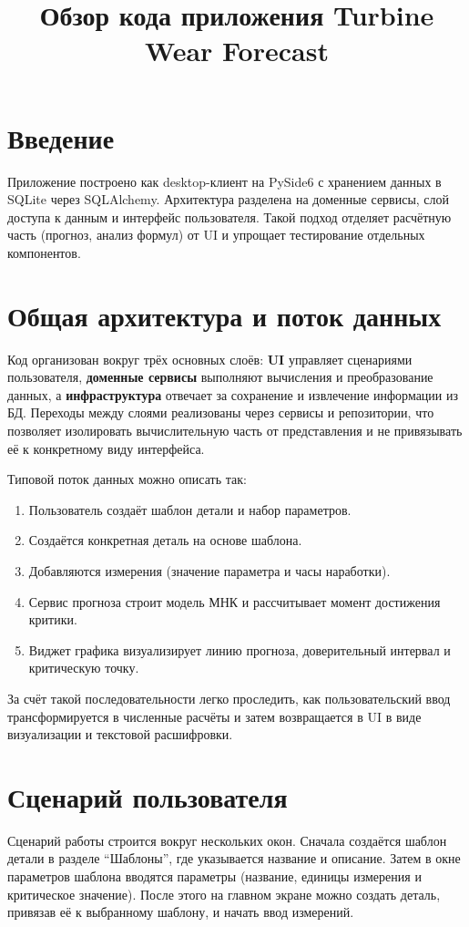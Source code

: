 \documentclass[12pt,a4paper]{article}
\title{Обзор кода приложения Turbine Wear Forecast}
\author{}
\date{}
\begin{document}
\maketitle

\section*{Введение}
Приложение построено как desktop-клиент на PySide6 с хранением данных в SQLite
через SQLAlchemy. Архитектура разделена на доменные сервисы, слой доступа к данным
и интерфейс пользователя.
Такой подход отделяет расчётную часть (прогноз, анализ формул) от UI и упрощает
тестирование отдельных компонентов.

\section*{Общая архитектура и поток данных}
Код организован вокруг трёх основных слоёв: \textbf{UI} управляет сценариями пользователя,
\textbf{доменные сервисы} выполняют вычисления и преобразование данных, а
\textbf{инфраструктура} отвечает за сохранение и извлечение информации из БД.
Переходы между слоями реализованы через сервисы и репозитории, что позволяет
изолировать вычислительную часть от представления и не привязывать её к конкретному виду интерфейса.

Типовой поток данных можно описать так:
\begin{enumerate}
  \item Пользователь создаёт шаблон детали и набор параметров.
  \item Создаётся конкретная деталь на основе шаблона.
  \item Добавляются измерения (значение параметра и часы наработки).
  \item Сервис прогноза строит модель МНК и рассчитывает момент достижения критики.
  \item Виджет графика визуализирует линию прогноза, доверительный интервал и критическую точку.
\end{enumerate}
За счёт такой последовательности легко проследить, как пользовательский ввод
трансформируется в численные расчёты и затем возвращается в UI в виде визуализации и текстовой расшифровки.

\section*{Сценарий пользователя}
Сценарий работы строится вокруг нескольких окон. Сначала создаётся шаблон детали
в разделе ``Шаблоны'', где указывается название и описание. Затем в окне параметров
шаблона вводятся параметры (название, единицы измерения и критическое значение).
После этого на главном экране можно создать деталь, привязав её к выбранному шаблону,
и начать ввод измерений.
\end{document}
